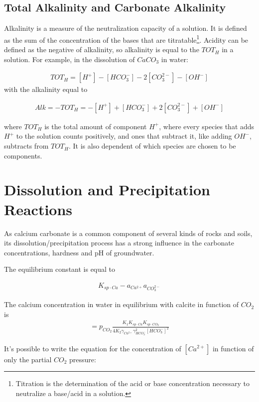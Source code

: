\documentclass[11pt,twoside]{report}
\begin{document}
\subsection{Total Alkalinity and Carbonate Alkalinity}
Alkalinity is a measure of the neutralization capacity of a solution. It is defined as the sum of the concentration of the bases that are titratable\footnote{Titration is the determination of the acid or base concentration necessary to neutralize a base/acid in a solution. }. Acidity can be defined as the negative of alkalinity, so alkalinity is equal to the $TOT_{H}$ in a solution. For example, in the dissolution of $CaCO_{3}$ in water:

\begin{align}
   TOT_{H} = [H^{+}] - [HCO_{3}^{-}] - 2[CO_{3}^{2-}] - [OH^{-}]
\end{align}
with the alkalinity equal to 

\begin{align}
   Alk = -TOT_{H} = -[H^{+}] + [HCO_{3}^{-}] + 2[CO_{3}^{2-}] + [OH^{-}]
\end{align}

where $TOT_{H}$ is the total amount of component $H^{+}$, where every species that adds $H^{+}$ to the solution counts positively, and ones that subtract it, like adding $OH^{-}$, subtracts from $TOT_{H}$. It is also dependent of which species are chosen to be components.

\section{Dissolution and Precipitation Reactions}
As calcium carbonate is a common component of several kinds of rocks and soils, its dissolution/precipitation process has a strong influence in the carbonate concentrations, hardness and pH of groundwater. 

The equilibrium constant is equal to 

\begin{align}
   K_{sp \cdot Ca} - a_{Ca^{2+}}a_{CO^{2-}_{3}}
\end{align}

The calcium concentration in water in equilibrium with calcite in function of $CO_{2}$ is
\begin{align}
   [Ca^{2+}] = p_{CO_{2}}\frac{K_{1} K_{sp \cdot Ca}  K_{sp \cdot CO_{2}}}{4K_{2}\gamma_{Ca^{2+}} \gamma_{HCO_{3}^{-}}^{2} [HCO_{3}^{-}]^{2} }
\end{align}

It's possible to write the equation for the concentration of $[Ca^{2+}]$ in function of only the partial $CO_{2}$ pressure:
\end{document}
